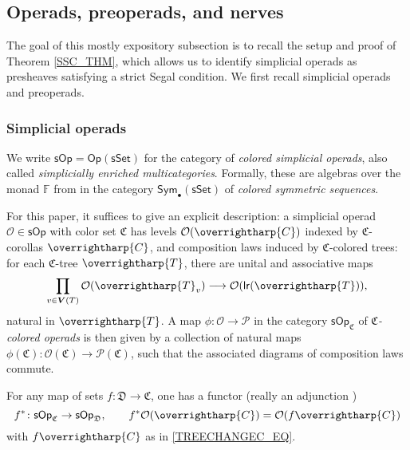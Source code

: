 \documentclass[a4paper,10pt
,draft
]{article}%
\numberwithin{equation}{section}
\numberwithin{figure}{section}
\theoremstyle{definition} %
\newcommand{\longto}{\longrightarrow}%
\newcommand{\vect}[1]{\text{\overrightharp{\ensuremath{#1}}}}
\newcommand{\Sym}{\ensuremath{\mathsf{Sym}}}%
\newcommand{\sSet}{\ensuremath{\mathsf{sSet}}}%
\newcommand{\Op}{\mathsf{Op}}%
\newcommand{\sOp}{\ensuremath{\mathsf{sOp}}}%
\renewcommand{\O}{\ensuremath{\mathcal O}}
\renewcommand{\P}{\ensuremath{\mathcal P}}
\newcommand{\1}{\ensuremath{\mathbbm 1}}%
\begin{document}
\subsection{Operads, preoperads, and nerves}
\label{NERVE_SEC}

The goal of this mostly expository subsection is to recall the setup and proof of Theorem \ref{SSC_THM},
which allows us to identify simplicial operads as presheaves satisfying a strict Segal condition.
We first recall simplicial operads and preoperads.


\subsubsection*{Simplicial operads}

We write $\sOp = \Op(\sSet)$ for the category of \textit{colored simplicial operads}, also called \textit{simplicially enriched multicategories}.
Formally, these are 
algebras over the monad $\mathbb F$ from \cite[Def. \ref{OC-FREEOP DEF}]{BP_FCOP}
in the category $\Sym_\bullet(\sSet)$ of \textit{colored symmetric sequences}.

For this paper, it suffices to give  an explicit description:
a simplicial operad $\O \in \sOp$ with color set $\mathfrak C$
has levels $\O(\vect C)$ indexed by
$\mathfrak C$-corollas $\vect C$, %
and composition laws induced by $\mathfrak C$-colored trees:
for each $\mathfrak C$-tree $\vect T$,
there are unital and associative maps
\[
        \prod_{v \in \boldsymbol{V}(T)}\O(\vect T_v) \longto \O(\mathsf{lr}(\vect T)),
\]
natural in $\vect T$.
A map
$\phi \colon \O \to \P$
in the category $\sOp_{\mathfrak C}$ of \textit{$\mathfrak C$-colored operads}
is then given by a collection of natural maps
$\phi(\mathfrak C) \colon \O(\mathfrak C) \to \P(\mathfrak C)$,
such that the associated diagrams of composition laws commute.

For any map of sets $f \colon \mathfrak D \to \mathfrak C$,
one has a functor (really an adjunction \cite[Rem. \ref{OC-OP_MAP REM}]{BP_FCOP})
\[
        f^{\**} \colon \sOp_{\mathfrak C} \to \sOp_{\mathfrak D},
        \qquad
        f^{\**}\O(\vect C) = \O(f \vect C)
\]
with $f \vect C$ as in \eqref{TREECHANGEC_EQ}.
\end{document}
